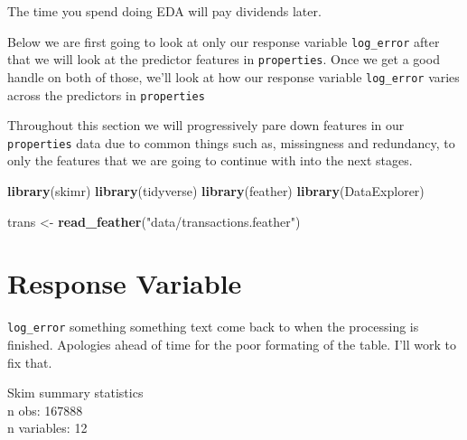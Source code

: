 \documentclass[]{book}
\newenvironment{Shaded}{\begin{snugshade}}{\end{snugshade}}
\newcommand{\KeywordTok}[1]{\textcolor[rgb]{0.13,0.29,0.53}{\textbf{#1}}}
\newcommand{\StringTok}[1]{\textcolor[rgb]{0.31,0.60,0.02}{#1}}
\newcommand{\OperatorTok}[1]{\textcolor[rgb]{0.81,0.36,0.00}{\textbf{#1}}}
\newcommand{\NormalTok}[1]{#1}
\theoremstyle{definition}
\theoremstyle{definition}
\theoremstyle{definition}
\theoremstyle{remark}
\begin{document}
The time you spend doing EDA will pay dividends later.

Below we are first going to look at only our response variable
\texttt{log\_error} after that we will look at the predictor features in
\texttt{properties}. Once we get a good handle on both of those, we'll
look at how our response variable \texttt{log\_error} varies across the
predictors in \texttt{properties}

Throughout this section we will progressively pare down features in our
\texttt{properties} data due to common things such as, missingness and
redundancy, to only the features that we are going to continue with into
the next stages.

\begin{Shaded}
\begin{Highlighting}[]
\KeywordTok{library}\NormalTok{(skimr)}
\KeywordTok{library}\NormalTok{(tidyverse)}
\KeywordTok{library}\NormalTok{(feather)}
\KeywordTok{library}\NormalTok{(DataExplorer)}

\NormalTok{trans <-}\StringTok{ }\KeywordTok{read_feather}\NormalTok{(}\StringTok{"data/transactions.feather"}\NormalTok{)}
\end{Highlighting}
\end{Shaded}

\section{Response Variable}\label{response-variable}

\texttt{log\_error} something something text come back to when the
processing is finished. Apologies ahead of time for the poor formating
of the table. I'll work to fix that.

\begin{Shaded}
\end{Shaded}

Skim summary statistics\\
n obs: 167888\\
n variables: 12
\end{document}
